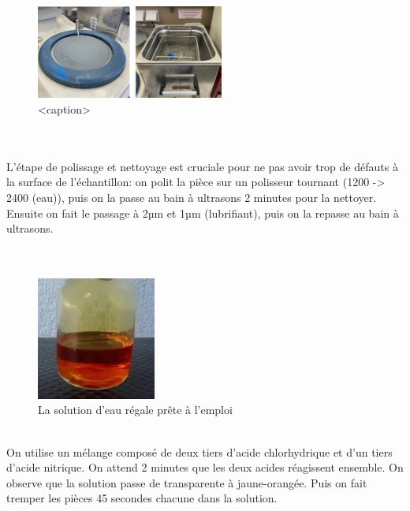 
\begin{figure}[H]
    \centering
    \includegraphics[width=0.55\textwidth]{images/WechatIMG1126.jpeg}
    \caption{<caption>}
    \label{<label>}
\end{figure}

\\\\
L'étape de polissage et nettoyage est cruciale pour ne pas avoir 
trop de défauts à la surface de l'échantillon:
on polit la pièce sur un polisseur tournant (1200 -> 2400 (eau)), puis on la passe au bain à ultrasons 2 minutes pour la nettoyer.
Ensuite on fait le passage à 2µm et 1µm (lubrifiant),
puis on la repasse au bain à ultrasons.\\
\\
\\

\begin{figure}[H]
    \centering
    \includegraphics[width=0.35\textwidth]{images/WechatIMG1128.jpeg}
    \caption{La solution d'eau régale prête à l'emploi}
    \label{<label>}
\end{figure}
\\
On utilise un mélange composé de deux tiers d'acide chlorhydrique 
et d'un tiers d'acide nitrique.
On attend 2 minutes que les deux acides réagissent ensemble.
On observe que la solution passe de transparente à jaune-orangée.
Puis on fait tremper les pièces 45 secondes chacune dans la solution.
\\


